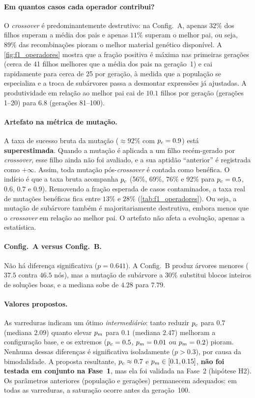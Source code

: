 \paragraph{Em quantos casos cada operador contribui?} O \emph{crossover} é
predominantemente destrutivo: na Config.~A, apenas $32\%$ dos filhos superam
a média dos pais e apenas $11\%$ superam o melhor pai, ou seja, $89\%$ das
recombinações pioram o melhor material genético disponível. A
\cref{fig:f1_operadores} mostra que a fração positiva é máxima nas primeiras
gerações (cerca de 41 filhos melhores que a média dos pais na geração~1) e
cai rapidamente para cerca de 25 por geração, à medida que a população se
especializa e a troca de subárvores passa a desmontar expressões já
ajustadas. A produtividade em relação ao melhor pai cai de $10.1$ filhos por
geração (gerações 1--20) para $6.8$ (gerações 81--100).

\paragraph{Artefato na métrica de mutação.} A taxa de sucesso bruta da
mutação ($\approx92\%$ com $p_c=0.9$) está \textbf{superestimada}. Quando a
mutação é aplicada a um filho recém-gerado por \emph{crossover}, esse filho
ainda não foi avaliado, e a sua aptidão ``anterior'' é registrada como
$+\infty$. Assim, toda mutação pós-\emph{crossover} é contada como benéfica.
O indício é que a taxa bruta acompanha $p_c$ (56\%, 69\%, 76\% e 92\% para
$p_c=0.5$, $0.6$, $0.7$ e $0.9$). Removendo a fração esperada de casos
contaminados, a taxa real de mutações benéficas fica entre $13\%$ e $28\%$
(\cref{tab:f1_operadores}). Ou seja, a mutação de subárvore também é
majoritariamente destrutiva, embora menos que o \emph{crossover} em relação
ao melhor pai. O artefato não afeta a evolução, apenas a estatística.

\paragraph{Config.~A versus Config.~B.} Não há diferença significativa
($p=0.641$). A Config.~B produz árvores menores ($37.5$ contra $46.5$ nós),
mas a mutação de subárvore a $30\%$ substitui blocos inteiros de soluções
boas, e a mediana sobe de $4.28$ para $7.79$.

\paragraph{Valores propostos.} As varreduras indicam um ótimo
\emph{intermediário}: tanto reduzir $p_c$ para $0.7$ (mediana $2.09$) quanto
elevar $p_m$ para $0.1$ (mediana $2.47$) melhoram a configuração base, e os
extremos ($p_c=0.5$, $p_m=0.01$ ou $p_m=0.2$) pioram. Nenhuma dessas
diferenças é significativa isoladamente ($p>0.3$), por causa da
bimodalidade. A proposta resultante, $p_c\approx0.7$ e
$p_m\in[0.1,0.15]$, \textbf{não foi testada em conjunto na Fase~1}, mas ela foi
validada na Fase~2 (hipótese H2). Os parâmetros anteriores (população e
gerações) permanecem adequados: em todas as varreduras, a saturação ocorre
antes da geração~100.

